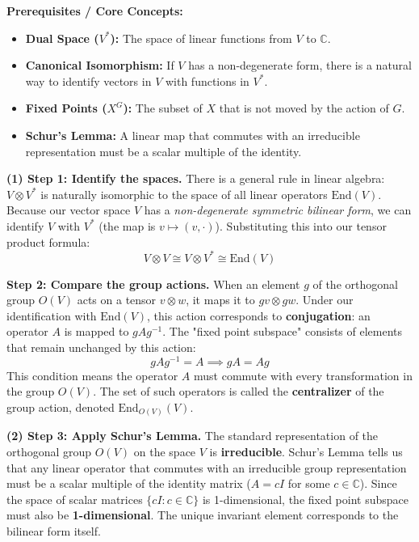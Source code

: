 \begin{solution}
\textbf{Prerequisites / Core Concepts:}
\begin{itemize}
    \item \textbf{Dual Space ($V^*$):} The space of linear functions from $V$ to $\mathbb{C}$.
    \item \textbf{Canonical Isomorphism:} If $V$ has a non-degenerate form, there is a natural way to identify vectors in $V$ with functions in $V^*$.
    \item \textbf{Fixed Points ($X^G$):} The subset of $X$ that is not moved by the action of $G$.
    \item \textbf{Schur's Lemma:} A linear map that commutes with an irreducible representation must be a scalar multiple of the identity.
\end{itemize}

\textbf{(1) Step 1: Identify the spaces.}
There is a general rule in linear algebra: $V \otimes V^*$ is naturally isomorphic to the space of all linear operators $\text{End}(V)$.
Because our vector space $V$ has a \textit{non-degenerate symmetric bilinear form}, we can identify $V$ with $V^*$ (the map is $v \mapsto (v, \cdot)$).
Substituting this into our tensor product formula:
\[ V \otimes V \cong V \otimes V^* \cong \text{End}(V) \]

\textbf{Step 2: Compare the group actions.}
When an element $g$ of the orthogonal group $O(V)$ acts on a tensor $v \otimes w$, it maps it to $gv \otimes gw$.
Under our identification with $\text{End}(V)$, this action corresponds to \textbf{conjugation}: an operator $A$ is mapped to $gAg^{-1}$.
The "fixed point subspace" consists of elements that remain unchanged by this action:
\[ gAg^{-1} = A \implies gA = Ag \]
This condition means the operator $A$ must commute with every transformation in the group $O(V)$.
The set of such operators is called the \textbf{centralizer} of the group action, denoted $\text{End}_{O(V)}(V)$.

\textbf{(2) Step 3: Apply Schur's Lemma.}
The standard representation of the orthogonal group $O(V)$ on the space $V$ is \textbf{irreducible}.
Schur's Lemma tells us that any linear operator that commutes with an irreducible group representation must be a scalar multiple of the identity matrix ($A = cI$ for some $c \in \mathbb{C}$).
Since the space of scalar matrices $\{ cI : c \in \mathbb{C} \}$ is 1-dimensional, the fixed point subspace must also be \textbf{1-dimensional}.
The unique invariant element corresponds to the bilinear form itself.
\end{solution}

